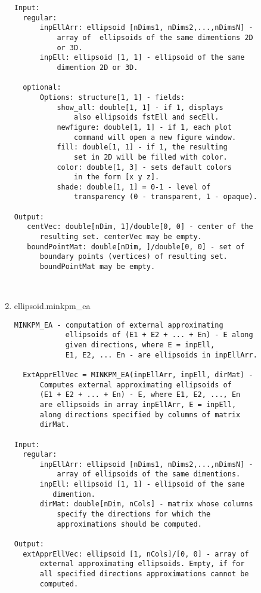 \begin{enumerate}
\begin{lstlisting}
Input:
  regular:
      inpEllArr: ellipsoid [nDims1, nDims2,...,nDimsN] -
          array of  ellipsoids of the same dimentions 2D
          or 3D.
      inpEll: ellipsoid [1, 1] - ellipsoid of the same
          dimention 2D or 3D.

  optional:
      Options: structure[1, 1] - fields:
          show_all: double[1, 1] - if 1, displays
              also ellipsoids fstEll and secEll.
          newfigure: double[1, 1] - if 1, each plot
              command will open a new figure window.
          fill: double[1, 1] - if 1, the resulting
              set in 2D will be filled with color.
          color: double[1, 3] - sets default colors
              in the form [x y z].
          shade: double[1, 1] = 0-1 - level of
              transparency (0 - transparent, 1 - opaque).

Output:
   centVec: double[nDim, 1]/double[0, 0] - center of the
      resulting set. centerVec may be empty.
   boundPointMat: double[nDim, ]/double[0, 0] - set of
      boundary points (vertices) of resulting set.
      boundPointMat may be empty.



\end{lstlisting}
\fontfamily{\familydefault}
\selectfont
\item {ellipsoid.minkpm\_ea}
\selectfont
\begin{lstlisting}
MINKPM_EA - computation of external approximating
            ellipsoids of (E1 + E2 + ... + En) - E along
            given directions, where E = inpEll,
            E1, E2, ... En - are ellipsoids in inpEllArr.

  ExtApprEllVec = MINKPM_EA(inpEllArr, inpEll, dirMat) -
      Computes external approximating ellipsoids of
      (E1 + E2 + ... + En) - E, where E1, E2, ..., En
      are ellipsoids in array inpEllArr, E = inpEll,
      along directions specified by columns of matrix
      dirMat.

Input:
  regular:
      inpEllArr: ellipsoid [nDims1, nDims2,...,nDimsN] -
          array of ellipsoids of the same dimentions.
      inpEll: ellipsoid [1, 1] - ellipsoid of the same
         dimention.
      dirMat: double[nDim, nCols] - matrix whose columns
          specify the directions for which the
          approximations should be computed.

Output:
  extApprEllVec: ellipsoid [1, nCols]/[0, 0] - array of
      external approximating ellipsoids. Empty, if for
      all specified directions approximations cannot be
      computed.


\end{lstlisting}
\end{enumerate}
